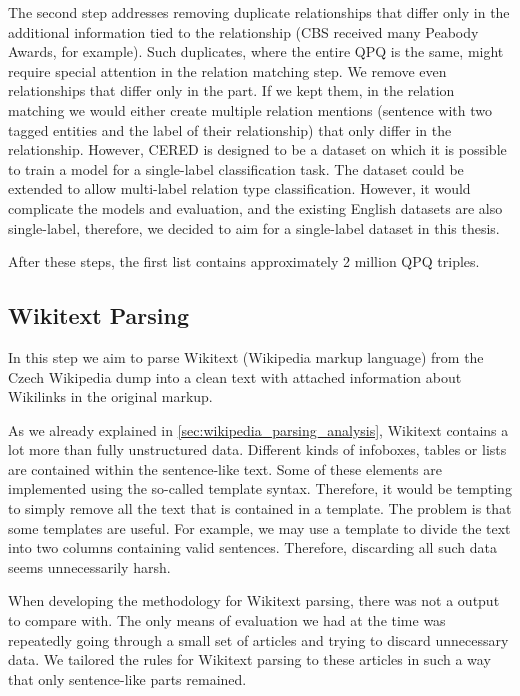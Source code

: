The second step addresses removing duplicate relationships that differ only in the additional information tied to the relationship (CBS received many Peabody Awards, for example). Such duplicates, where the entire QPQ is the same, might require special attention in the relation matching step. We remove even relationships that differ only in the  part. If we kept them, in the relation matching we would either create multiple relation mentions (sentence with two tagged entities and the label of their relationship) that only differ in the relationship. However, CERED is designed to be a dataset on which it is possible to train a model for a single-label classification task. The dataset could be extended to allow multi-label relation type classification. However, it would complicate the models and evaluation, and the existing English datasets are also single-label, therefore, we decided to aim for a single-label dataset in this thesis.

After these steps, the first list contains approximately 2 million QPQ triples.

\subsection{Wikitext Parsing}

\label{sec:wikiperia_parsing_implementation}

In this step we aim to parse Wikitext (Wikipedia markup language) from the Czech Wikipedia dump into a clean text with attached information about Wikilinks in the original markup.

As we already explained in \autoref{sec:wikipedia_parsing_analysis}, Wikitext contains a lot more than fully unstructured data. Different kinds of infoboxes, tables or lists are contained within the sentence-like text. Some of these elements are implemented using the so-called template syntax. Therefore, it would be tempting to simply remove all the text that is contained in a template. The problem is that some templates are useful. For example, we may use a template to divide the text into two columns containing valid sentences. Therefore, discarding all such data seems unnecessarily harsh.

When developing the methodology for Wikitext parsing, there was not a  output to compare with. The only means of evaluation we had at the time was repeatedly going through a small set of articles and trying to discard unnecessary data. We tailored the rules for Wikitext parsing to these articles in such a way that only sentence-like parts remained. 

